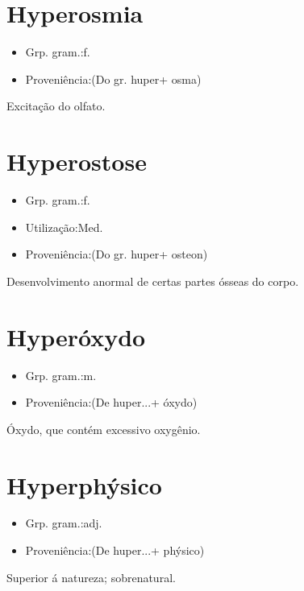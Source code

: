 \documentclass{article}
\begin{document}
\section{Hyperosmia}
\begin{itemize}
\item {Grp. gram.:f.}
\end{itemize}
\begin{itemize}
\item {Proveniência:(Do gr. \textunderscore huper\textunderscore  + \textunderscore osma\textunderscore )}
\end{itemize}
Excitação do olfato.
\section{Hyperostose}
\begin{itemize}
\item {Grp. gram.:f.}
\end{itemize}
\begin{itemize}
\item {Utilização:Med.}
\end{itemize}
\begin{itemize}
\item {Proveniência:(Do gr. \textunderscore huper\textunderscore  + \textunderscore osteon\textunderscore )}
\end{itemize}
Desenvolvimento anormal de certas partes ósseas do corpo.
\section{Hyperóxydo}
\begin{itemize}
\item {Grp. gram.:m.}
\end{itemize}
\begin{itemize}
\item {Proveniência:(De \textunderscore huper...\textunderscore  + \textunderscore óxydo\textunderscore )}
\end{itemize}
Óxydo, que contém excessivo oxygênio.
\section{Hyperphýsico}
\begin{itemize}
\item {Grp. gram.:adj.}
\end{itemize}
\begin{itemize}
\item {Proveniência:(De \textunderscore huper...\textunderscore  + \textunderscore phýsico\textunderscore )}
\end{itemize}
Superior á natureza; sobrenatural.
\end{document}
